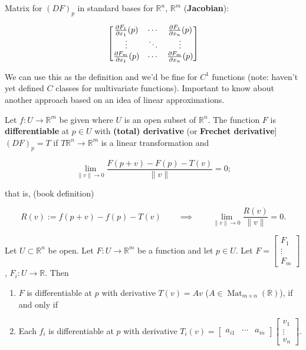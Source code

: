 Matrix for \((DF)_p\) in standard bases for \(\mathbb{R}^n\), \(\mathbb{R}^m\) (\textbf{Jacobian}):

\[
\begin{bmatrix}
\pderiv{F_1}{x_1}(p) & \cdots & \pderiv{F_1}{x_n}(p) \\
\vdots & \ddots & \vdots \\
\pderiv{F_m}{x_1}(p) & \cdots & \pderiv{F_m}{x_n}(p) \end{bmatrix}
\]

We can use this as the definition and we'd be fine for \(C^1\) functions (note: haven't yet defined \(C\) classes for multivariate functions). Important to know about another approach based on an idea of linear approximations.

\begin{definition}

Let \(f: U \to \mathbb{R}^m\) be given where \(U\) is an open subset of \(\mathbb{R}^n\). The function \(F\) is \textbf{differentiable} at \(p \in U\) with \textbf{(total) derivative} (or \textbf{Frechet derivative}] \((DF)_p = T\) if \(T \mathbb{R}^n \to \mathbb{R}^m\) is a linear transformation and

\[
\lim_{\lVert v \rVert \to 0} \frac{F(p+ v) - F(p) - T(v)}{ \lVert v \rVert} =0;
\]

that is, (book definition)

\[
R(v) := f(p + v) - f(p) - T(v)   \qquad \implies \qquad \lim_{\lVert v \rVert \to 0} \frac{R(v)}{ \lVert v \rVert} = 0.
\]

\end{definition}

\begin{proposition}

Let \(U \subset \mathbb{R}^n\) be open. Let \(F: U \to \mathbb{R}^m\) be a function and let \(p \in U\). Let \(F = \begin{bmatrix} F_1 \\ \vdots \\ F_m \end{bmatrix}\) , \(F_i : U \to \mathbb{R}\). Then

\begin{enumerate}

\item \(F\) is differentiable at \(p\) with derivative \(T(v) = Av\) (\(A \in \operatorname{Mat}_{m \times n} (\mathbb{R})\)), if and only if 

\item Each \(f_i\) is differentiable at \(p\) with derivative \(T_i(v) = \begin{bmatrix} a_{i1} & \cdots & a_{in} \end{bmatrix} \begin{bmatrix} v_1 \\ \vdots \\ v_n \end{bmatrix}\).

\end{enumerate}



\end{proposition}

